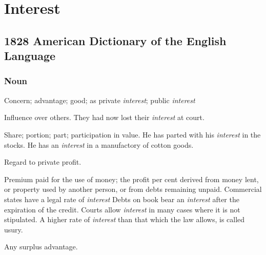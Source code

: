 \section{Interest}
	\label{INTEREST}
	

\subsection{1828 American Dictionary of the English Language} %
	\label{INTEREST-1828}
	
	\subsubsection{Noun}

		\begin{compactitem}
			\item Concern; advantage; good; as private \textit{interest}; public \textit{interest}
			\item[1] Influence over others. They had now lost their \textit{interest} at court.
			\item[2] Share; portion; part; participation in value. He has parted with his \textit{interest} in the stocks. He has an \textit{interest} in a manufactory of cotton goods.
			\item[3] Regard to private profit.
			\item[4] Premium paid for the use of money; the profit per cent derived from money lent, or property used by another person, or from debts remaining unpaid. Commercial states have a legal rate of \textit{interest} Debts on book bear an \textit{interest} after the expiration of the credit. Courts allow \textit{interest} in many cases where it is not stipulated. A higher rate of \textit{interest} than that which the law allows, is called usury.
			\item[5] Any surplus advantage.
		\end{compactitem}



